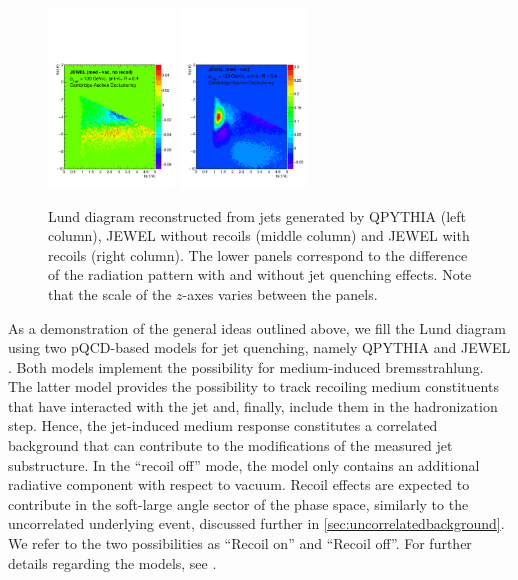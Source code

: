 \begin{figure}[h]
\includegraphics[width=0.3\textwidth]{figures/LundMC/Jewel_Diff}
\includegraphics[width=0.3\textwidth]{figures/LundMC/Jewel_DiffRecoil}
\caption{Lund diagram reconstructed from jets generated by QPYTHIA (left column), JEWEL without recoils (middle column) and JEWEL with recoils (right column).
The lower panels correspond to the difference of the radiation pattern with and without jet quenching effects. Note that the scale of the $z$-axes varies between the panels.}
\label{fig:PS2}
\end{figure}
As a demonstration of the general ideas outlined above, we fill the Lund diagram using 
two pQCD-based models for jet quenching, namely QPYTHIA \cite{Armesto:2009fj} and JEWEL \cite{Zapp:2011ya,Zapp:2012ak}. 
Both models implement the possibility for medium-induced bremsstrahlung. The latter model provides the possibility to track recoiling medium constituents that have interacted with the jet and, finally, include them in the hadronization step. 
Hence, the jet-induced medium response constitutes a correlated background that can contribute to the modifications of the measured jet substructure. In the ``recoil off'' mode, the model only contains an additional radiative component with respect to vacuum.
Recoil effects are expected to contribute in the soft-large angle sector of the phase space, similarly to the uncorrelated underlying event, discussed further in \autoref{sec:uncorrelatedbackground}.
We refer to the two possibilities as ``Recoil on'' and ``Recoil off''. For further details regarding the models, see .

